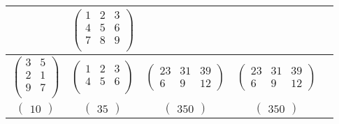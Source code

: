 \begin{table}[ht]
\begin{center}
\begin{threeparttable}
\begin{tabular}{|c|c|c|c|c|}
				&
				$\begin{pmatrix}
					1 & 2 & 3\\
					4 & 5 & 6 \\
					7 & 8 & 9 \\
				\end{pmatrix}$ \\ 
				\hline
				$\begin{pmatrix}
					3 & 5\\
					2 & 1\\
					9 & 7\\
				\end{pmatrix}$
				&
				$\begin{pmatrix}
					1 & 2 & 3\\
					4 & 5 & 6 \\
				\end{pmatrix}$
				&
				$\begin{pmatrix}
					23 & 31 & 39 \\
					6 & 9 & 12
				\end{pmatrix}$ 
				&
				$\begin{pmatrix}
					23 & 31 & 39 \\
					6 & 9 & 12
				\end{pmatrix}$ \\ 
				\hline
				$\begin{pmatrix}
					10
				\end{pmatrix}$
				&
				$\begin{pmatrix}
					35
				\end{pmatrix}$
				&
				$\begin{pmatrix}
					350
				\end{pmatrix}$ 
				&
				$\begin{pmatrix}
					350
				\end{pmatrix}$ \\ 
				\hline
			\end{tabular}
		\end{threeparttable}
	\end{center}
\end{table}

\clearpage

